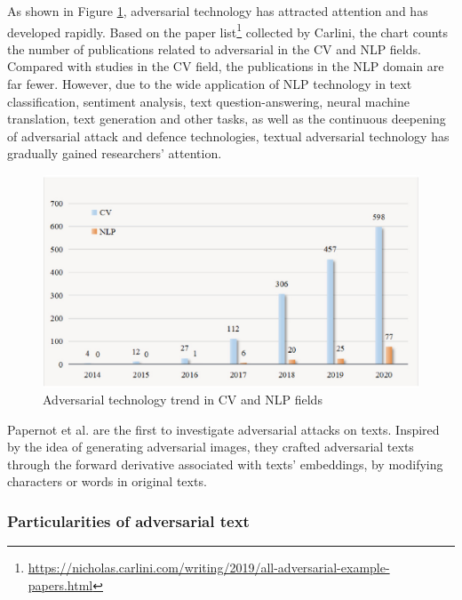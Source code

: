 As shown in Figure \ref{fig:2_2_adversarial_trend}, adversarial technology has attracted attention and has developed rapidly. Based on the paper list\footnote{\url{https://nicholas.carlini.com/writing/2019/all-adversarial-example-papers.html}} collected by Carlini, the chart counts
the number of publications related to adversarial in the CV and NLP fields. Compared with studies in the CV field, the publications in the NLP domain are far fewer. However, due to the wide application of NLP technology in text classification, sentiment analysis, text question-answering, neural machine translation, text generation and other tasks, as well as the continuous deepening of adversarial attack and defence technologies, textual adversarial technology has gradually gained researchers' attention.

\begin{figure}
    \centering
    \includegraphics[width=0.8\linewidth]{images/2_2_papers.png}
    \caption{Adversarial technology trend in CV and NLP fields \cite{QIU2022278}}
    \label{fig:2_2_adversarial_trend}
\end{figure}

Papernot et al. \cite{journals/corr/PapernotMSH16} are the first to investigate adversarial attacks
on texts. Inspired by the idea of generating adversarial images, they crafted adversarial texts through the forward derivative associated with texts' embeddings, by modifying characters or words in original texts.


\subsubsection{Particularities of adversarial text}\label{subsubsec:particularities-of-adversarial-text}

